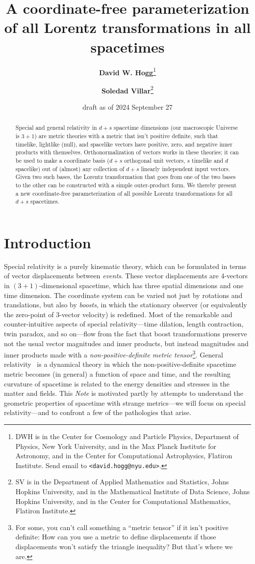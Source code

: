 \documentclass{article}
\title{\bfseries A coordinate-free parameterization of all Lorentz transformations in all spacetimes}
\author{\textbf{David W. Hogg}\footnote{DWH is in the Center for Cosmology and Particle Physics, Department of Physics, New York University, and in the Max Planck Institute for Astronomy, and in the Center for Computational Astrophysics, Flatiron Institute. Send email to \texttt{<david.hogg@nyu.edu>}.}
        \and
        \textbf{Soledad Villar}\footnote{SV is in the Department of Applied Mathematics and Statistics, Johns Hopkins University, and in the Mathematical Institute of Data Science, Johns Hopkins University, and in the Center for Computational Mathematics, Flatiron Institute.}}
\date{draft as of 2024 September 27}
\newcommand{\plus}{\!+\!} %
\newcommand{\documentname}{\textsl{Note}}
\begin{document}
\thispagestyle{plain}
\maketitle

\begin{abstract}\noindent %
    Special and general relativity in $d+s$ spacetime dimensions (our macroscopic Universe is $3+1$) are metric theories with a metric that isn't positive definite, such that timelike, lightlike (null), and spacelike vectors have positive, zero, and negative inner products with themselves.
    Orthonormalization of vectors works in these theories; it can be used to make a coordinate basis ($d+s$ orthogonal unit vectors, $s$ timelike and $d$ spacelike) out of (almost) any collection of $d+s$ linearly independent input vectors.
    Given two such bases, the Lorentz transformation that goes from one of the two bases to the other can be constructed with a simple outer-product form.
    We thereby present a new coordinate-free parameterization of all possible Lorentz transformations for all $d+s$ spacetimes.
\end{abstract}

\section{Introduction}\label{sec:intro}

Special relativity \cite{sr} is a purely kinematic theory, which can be formulated in terms of vector displacements between \emph{events}.
These vector displacements are 4-vectors in $(3\plus1)$-dimensional spacetime, which has three spatial dimensions and one time dimension.
The coordinate system can be varied not just by rotations and translations, but also by \emph{boosts}, in which the stationary observer (or equivalently the zero-point of 3-vector velocity) is redefined.
Most of the remarkable and counter-intuitive aspects of special relativity---time dilation, length contraction, twin paradox, and so on---flow from the fact that boost transformations preserve not the usual vector magnitudes and inner products, but instead magnitudes and inner products made with a \emph{non-positive-definite metric tensor}\footnote{For some, you can't call something a ``metric tensor'' if it isn't positive definite: How can you use a metric to define displacements if those displacements won't satisfy the triangle inequality? But that's where we are.}.
General relativity~\cite{gr} is a dynamical theory in which the non-positive-definite spacetime metric becomes (in general) a function of space and time, and the resulting curvature of spacetime is related to the energy densities and stresses in the matter and fields.
This \documentname{} is motivated partly by attempts to understand the geometric properties of spacetime with strange metrics---we will focus on special relativity---and to confront a few of the pathologies that arise.
\end{document}
